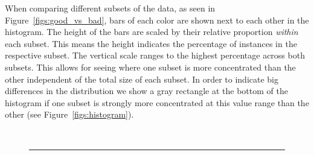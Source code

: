 When comparing different subsets of the data, as seen in Figure~\ref{figs:good_vs_bad}, bars of each color are shown next to each other in the histogram.
The height of the bars are scaled by their relative proportion \emph{within} each subset.
This means the height indicates the percentage of instances in the respective subset.
The vertical scale ranges to the highest percentage across both subsets.
This allows for seeing where one subset is more concentrated than the other independent of the total size of each subset.
In order to indicate big differences in the distribution we show a gray rectangle at the bottom of the histogram if one subset is strongly more concentrated at this value range than the other (see Figure~\ref{figs:histogram}).

\begin{figure}[t]
\centering
{}
~\\
\noindent\rule{\linewidth}{0.4pt}
~\\
\end{figure}
